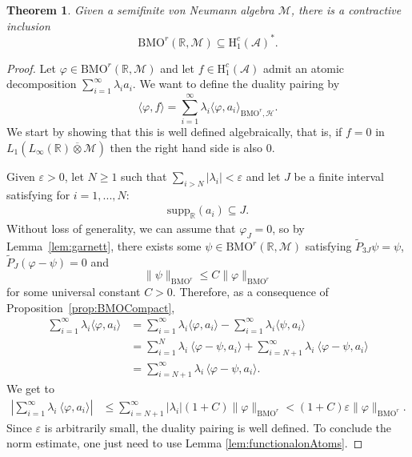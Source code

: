 \documentclass[psamsfonts]{amsart}
\newtheorem{theorem}{Theorem}[section]
\newcommand{\R}{\mathbb{R}}
\newcommand{\Lone}{L_1}
\newcommand{\Linfty}{L_\infty}
\newcommand{\Honec}{\mathrm{H}_1^c}
\newcommand{\BMOr}{\mathrm{BMO}^r}
\newcommand{\Hardyc}{\Honec(\mathcal{A})}
\begin{document}
    \begin{theorem}
        Given a semifinite von Neumann algebra $\mathcal{M}$, there is a contractive inclusion 
        $$            \BMOr(\mathbb{R},\mathcal{M}) \subseteq \Hardyc^*.$$
    \end{theorem}
    \begin{proof}
      
      Let $\varphi \in \BMOr(\mathbb{R},\mathcal{M})$ and let
      $f \in \Hardyc$ admit an atomic decomposition
      $\sum_{i=1}^\infty \lambda_i a_i$. We want to define the duality pairing by
      $$\langle \varphi, f\rangle = \sum_{i=1}^\infty \lambda_i \langle \varphi,a_i\rangle_{\BMOr,\mathcal H}.$$
      We start by showing that this is well defined algebraically, that
      is, if $f=0$ in
      $\Lone(\Linfty(\mathbb{R}) \overline{\otimes} \mathcal{M})$ then
      the right hand side is also 0.
      
 Given $\varepsilon > 0$, let $N \geq 1$ such that
      $\sum_{i > N} |\lambda_i| < \varepsilon$ and let $J$ be a finite
      interval satisfying for $i=1,...,N$:
        \begin{align*}
            \mathrm{supp}_\R(  a_i ) \subseteq J.
        \end{align*}
        Without loss of generality, we can assume that $\varphi_J = 0$, so by Lemma~\ref{lem:garnett}, there exists some $\psi \in \BMOr(\mathbb{R},\mathcal{M})$ satisfying $\widetilde{P}_{3J}\psi = \psi$, $\widetilde{P}_{J}(\varphi-\psi)=0$ and 
        $$
        \|\psi\|_{\BMOr} \leq C \|\varphi\|_{\BMOr}
        $$
        for some universal constant $C>0$. Therefore, as a consequence of Proposition~\ref{prop:BMOCompact},
        \begin{align*}
            \sum_{i=1}^\infty \lambda_i \langle \varphi, a_i \rangle &=  \sum_{i=1}^\infty \lambda_i \langle \varphi, a_i\rangle - \sum_{i=1}^\infty \lambda_i \langle \psi, a_i \rangle \\
            &= \sum_{i=1}^N \lambda_i \ \langle \varphi - \psi, a_i \rangle + \sum_{i=N+1}^\infty \lambda_i \ \langle \varphi - \psi, a_i \rangle \\
            &= \sum_{i=N+1}^\infty \lambda_i \,\langle \varphi - \psi, a_i \rangle.
        \end{align*}
        We get to
        \begin{align*}
            |\sum_{i=1}^\infty \lambda_i \ \langle \varphi, a_i \rangle | &\leq \sum_{i=N+1}^\infty |\lambda_i| (1 + C) \|\varphi\|_{\BMOr} < (1+C)\varepsilon \|\varphi\|_{\BMOr}.
        \end{align*}
        Since $\varepsilon$ is arbitrarily small, the duality pairing is well defined. To conclude the norm estimate, one just need to use Lemma \ref{lem:functionalonAtoms}.
    \end{proof}
\end{document}
